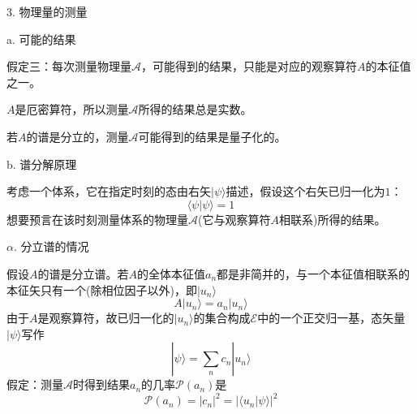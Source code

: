 \documentclass[11pt,a4paper]{article}
\begin{document}
3. 物理量的测量

a. 可能的结果
\begin{tcolorbox}[colback=green!15,colframe=green!40!black,title= ]
假定三：每次测量物理量$\mathscr{A}$，可能得到的结果，只能是对应的观察算符$A$的本征值之一。
\end{tcolorbox}

$A$是厄密算符，所以测量$\mathscr{A}$所得的结果总是实数。

若$A$的谱是分立的，测量$\mathscr{A}$可能得到的结果是量子化的。

b. 谱分解原理

考虑一个体系，它在指定时刻的态由右矢$|\psi\rangle$描述，假设这个右矢已归一化为$1$：
\begin{equation}
\langle \psi |\psi\rangle = 1
\end{equation}
想要预言在该时刻测量体系的物理量$\mathscr{A}$(它与观察算符$A$相联系)所得的结果。

$\alpha$. 分立谱的情况

假设$A$的谱是分立谱。若$A$的全体本征值$a_n$都是非简并的，与一个本征值相联系的本征矢只有一个(除相位因子以外)，即$|u_n\rangle$
\begin{equation}
A|u_n\rangle = a_n |u_n \rangle
\end{equation}
由于$A$是观察算符，故已归一化的$|u_n\rangle$的集合构成$\mathscr{E}$中的一个正交归一基，态矢量$ |\psi\rangle$写作
\begin{equation}
|\psi\rangle = \sum_n c_n |u_n \rangle
\end{equation}
假定：测量$\mathscr{A}$时得到结果$a_n$的几率$\mathscr{P}(a_n)$是
\begin{equation}
\mathscr{P}(a_n) = |c_n|^2 = |\langle u_n |\psi\rangle|^2
\end{equation}
\end{document}
